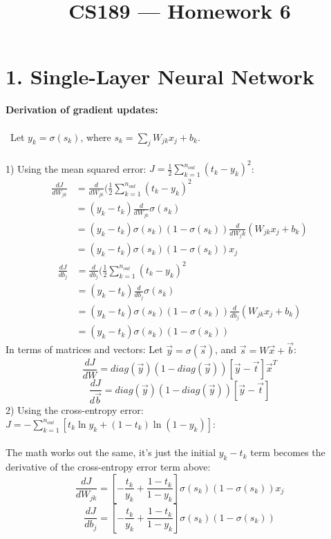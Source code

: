 \documentclass[11pt]{article}
\title{CS189 --- Homework 6}
\author{\Name}
\begin{document}
\maketitle

\section*{1. Single-Layer Neural Network}

\textbf{ Derivation of gradient updates: }
\\\\\
Let $y_k = \sigma ( s_k  ) $, where $s_k  = \sum_j W_{jk} x_j + b_k $.
\\\\
1) Using the mean squared error: $J = \frac{1}{2} \sum_{k=1}^{n_{out}} (t_k - y_k)^2 $:
$$ \begin{aligned}
\frac{dJ}{d W_{jk} } &= \frac{d}{d W_{jk}} ( \frac{1}{2} \sum_{k=1}^{n_{out}} (t_k - y_k)^2 \\
&= (y_k - t_k) \frac{d}{d W_{jk}} \sigma(s_k) \\
&= (y_k - t_k) \sigma(s_k) (1 - \sigma(s_k)) \frac{d}{d W_jk} (W_{jk} x_j + b_k) \\
&= (y_k - t_k) \sigma(s_k) (1 - \sigma(s_k)) x_j 
\end{aligned} $$
$$ \begin{aligned}
\frac{dJ}{d b_j } &= \frac{d}{d b_j} ( \frac{1}{2} \sum_{k=1}^{n_{out}} (t_k - y_k)^2 \\
&= (y_k - t_k) \frac{d}{d b_j} \sigma(s_k) \\
&= (y_k - t_k) \sigma(s_k) (1 - \sigma(s_k)) \frac{d}{d b_j} (W_{jk} x_j + b_k) \\
&= (y_k - t_k) \sigma(s_k) (1 - \sigma(s_k)) 
\end{aligned} $$
In terms of matrices and vectors:
Let $\vec{y} = \sigma ( \vec{s} )$, and $\vec{s} = W \vec{x} + \vec{b} $:
$$ \boxed{\frac{dJ} {dW} = diag(\vec{y}) (1 - diag(\vec{y})) [ \vec{y} - \vec{t} ] \vec{x}^T} $$
$$ \boxed{\frac{dJ} {d\vec{b}} = diag(\vec{y}) (1 - diag(\vec{y})) [ \vec{y} - \vec{t} ]} $$
2) Using the cross-entropy error: $J = - \sum_{k=1}^{n_{out}} [t_k \ln y_k + (1 - t_k) \ln (1 - y_k)] $:
\\\\
The math works out the same, it's just the initial $y_k - t_k$ term becomes the derivative of the cross-entropy error term above:
$$ \frac{dJ}{d W_{jk} } = [ - \frac{t_k}{y_k} + \frac{1 - t_k}{1 - y_k} ] \sigma(s_k) (1 - \sigma(s_k)) x_j $$
$$ \frac{dJ}{d b_j } = [ - \frac{t_k}{y_k} + \frac{1 - t_k}{1 - y_k} ] \sigma(s_k) (1 - \sigma(s_k)) $$
\end{document}
